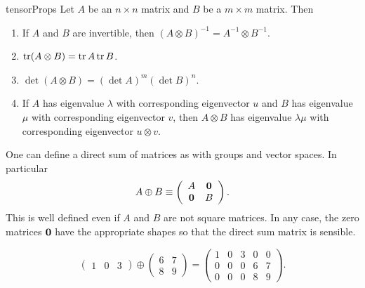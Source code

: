 \begin{proposition}{}{tensorProps}
Let $A$ be an $n\times n$ matrix and $B$ be a $m\times m$ matrix. Then
\begin{enumerate}
\item If $A$ and $B$ are invertible, then
$(A\otimes B)^{-1}=A^{-1}\otimes B^{-1}$.
\item $\tr(A\otimes B)=\tr A\tr B$.
\item $\det(A\otimes B)=(\det A)^m(\det B)^n$.
\item If $A$ has eigenvalue $\lambda$ with corresponding eigenvector
$u$ and $B$ has eigenvalue $\mu$ with corresponding eigenvector $v$,
then $A\otimes B$ has eigenvalue $\lambda\mu$ with corresponding
eigenvector $u\otimes v$.
\end{enumerate}
\end{proposition}

One can define a direct sum of matrices as with
groups and vector spaces. In particular
\begin{equation}
A\oplus B\equiv
 \left(\begin{array}{cc}
 A & {\mathbf 0}  \\
 {\mathbf 0} & B 
 \end{array}\right).
\end{equation}
This is well defined even if $A$ and $B$ are not square matrices.
In any case, the zero matrices ${\mathbf 0}$ have the appropriate shapes
so that the direct sum matrix is sensible.

\begin{example}{}{}
$$
\left(\begin{array}{ccc}
1 & 0 & 3
\end{array}\right) \oplus\left(\begin{array}{cc}
6 & 7 \\
8 & 9
\end{array}\right)=\left(\begin{array}{ccccc}
1 & 0 & 3 & 0 & 0 \\
0 & 0 & 0 & 6 & 7 \\
0 & 0 & 0 & 8 & 9
\end{array}\right).
$$
\end{example}

